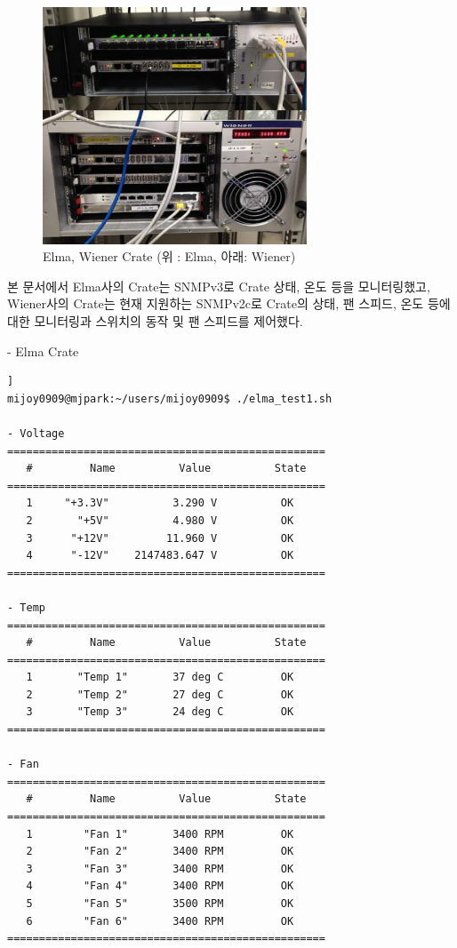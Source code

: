 \documentclass[11pt
  , a4paper
  , article
  , oneside
]{memoir}
\begin{document}
\begin{figure}[h]
  \centering
  \includegraphics[width=0.7\textwidth]{./images/elmawiener.eps}
  \caption{Elma, Wiener Crate (위 : Elma, 아래: Wiener)}
  \label{fig:elmawiener}   
\end{figure}

\vspace{2mm}

본 문서에서 Elma사의 Crate는 SNMPv3로 Crate 상태, 온도 등을 모니터링했고, Wiener사의 Crate는 현재 지원하는 SNMPv2c로 Crate의 상태, 팬 스피드, 온도 등에 대한 모니터링과 스위치의 동작 및 팬 스피드를 제어했다. 

\clearpage

- Elma Crate
\begin{lstlisting}[style=termstyle, caption=ELMA Crate 모니터링 결과]]
mijoy0909@mjpark:~/users/mijoy0909$ ./elma_test1.sh

- Voltage
==================================================
   #         Name          Value          State
==================================================
   1     "+3.3V"          3.290 V          OK
   2       "+5V"          4.980 V          OK
   3      "+12V"         11.960 V          OK
   4      "-12V"    2147483.647 V          OK
==================================================

- Temp
==================================================
   #         Name          Value          State
==================================================
   1       "Temp 1"       37 deg C         OK
   2       "Temp 2"       27 deg C         OK
   3       "Temp 3"       24 deg C         OK
==================================================

- Fan
==================================================
   #         Name          Value          State
==================================================
   1        "Fan 1"       3400 RPM         OK
   2        "Fan 2"       3400 RPM         OK
   3        "Fan 3"       3400 RPM         OK
   4        "Fan 4"       3400 RPM         OK
   5        "Fan 5"       3500 RPM         OK
   6        "Fan 6"       3400 RPM         OK
==================================================
\end{lstlisting}
\end{document}
